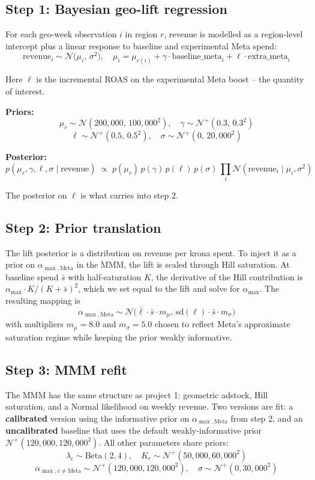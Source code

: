 \documentclass[a4paper,11pt]{article}
\begin{document}
\subsection{Step 1: Bayesian geo-lift regression}

For each geo-week observation $i$ in region $r$, revenue is modelled
as a region-level intercept plus a linear response to baseline and
experimental Meta spend:
$$\text{revenue}_i \sim \mathcal{N}\!\big(\mu_i,\, \sigma^2\big),
\quad \mu_i = \mu_{r(i)} + \gamma \cdot \text{baseline\_meta}_i + \ell \cdot \text{extra\_meta}_i$$

Here $\ell$ is the incremental ROAS on the experimental Meta boost --
the quantity of interest.

\textbf{Priors:}
$$\mu_r \sim \mathcal{N}(200{,}000,\, 100{,}000^2), \quad \gamma \sim \mathcal{N}^{+}(0.3,\, 0.3^2)$$
$$\ell \sim \mathcal{N}^{+}(0.5,\, 0.5^2), \quad \sigma \sim \mathcal{N}^{+}(0,\, 20{,}000^2)$$

\textbf{Posterior:}
$$p(\mu_r, \gamma, \ell, \sigma \mid \text{revenue}) \; \propto \; p(\mu_r) \, p(\gamma) \, p(\ell) \, p(\sigma) \, \prod_i \mathcal{N}(\text{revenue}_i \mid \mu_i, \sigma^2)$$

The posterior on $\ell$ is what carries into step 2.

\subsection{Step 2: Prior translation}

The lift posterior is a distribution on revenue per krona spent. To
inject it as a prior on $\alpha_{\max, \text{Meta}}$ in the MMM, the
lift is scaled through Hill saturation. At baseline spend $\bar{s}$
with half-saturation $K$, the derivative of the Hill contribution is
$\alpha_{\max} \cdot K / (K + \bar{s})^2$, which we set equal to the
lift and solve for $\alpha_{\max}$. The resulting mapping is
$$\alpha_{\max, \text{Meta}} \sim \mathcal{N}\!\big(\bar{\ell} \cdot \bar{s} \cdot m_\mu,\, \text{sd}(\ell) \cdot \bar{s} \cdot m_\sigma\big)$$
with multipliers $m_\mu = 8.0$ and $m_\sigma = 5.0$ chosen to reflect
Meta's approximate saturation regime while keeping the prior weakly
informative.

\subsection{Step 3: MMM refit}

The MMM has the same structure as project 1: geometric adstock, Hill
saturation, and a Normal likelihood on weekly revenue. Two versions
are fit: a \textbf{calibrated} version using the informative prior
on $\alpha_{\max, \text{Meta}}$ from step 2, and an
\textbf{uncalibrated} baseline that uses the default weakly-informative
prior $\mathcal{N}^{+}(120{,}000, 120{,}000^2)$. All other parameters
share priors:
$$\lambda_c \sim \text{Beta}(2, 4), \quad K_c \sim \mathcal{N}^{+}(50{,}000, 60{,}000^2)$$
$$\alpha_{\max, c \neq \text{Meta}} \sim \mathcal{N}^{+}(120{,}000, 120{,}000^2), \quad \sigma \sim \mathcal{N}^{+}(0, 30{,}000^2)$$
\end{document}
